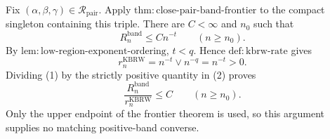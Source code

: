 Fix \((\alpha,\beta,\gamma)\in\mathcal R_{\mathrm{pair}}\).  Apply \(\mathrm{thm:close\mbox{-}pair\mbox{-}band\mbox{-}frontier}\) to the compact singleton containing this triple.  There are \(C<\infty\) and \(n_0\) such that
\[
R_n^{\mathrm{band}}\leq Cn^{-t}
\qquad(n\geq n_0).
\tag{1}
\]
By \(\mathrm{lem:low\mbox{-}region\mbox{-}exponent\mbox{-}ordering}\), \(t<q\).  Hence \(\mathrm{def:kbrw\mbox{-}rate}\) gives
\[
r_n^{\mathrm{KBRW}}=n^{-t}\vee n^{-q}=n^{-t}>0.
\tag{2}
\]
Dividing (1) by the strictly positive quantity in (2) proves
\[
\frac{R_n^{\mathrm{band}}}{r_n^{\mathrm{KBRW}}}\leq C
\qquad(n\geq n_0).
\]
Only the upper endpoint of the frontier theorem is used, so this argument supplies no matching positive-band converse.